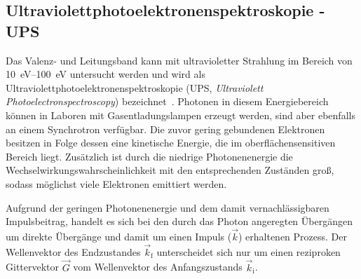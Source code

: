         \subsection{Ultraviolettphotoelektronenspektroskopie - UPS} \label{sec:UPS}
            Das Valenz- und Leitungsband kann mit ultravioletter Strahlung im Bereich von \SIrange{10}{100}{\electronvolt} untersucht werden und wird als Ultraviolettphotoelektronenspektroskopie (UPS, \textit{Ultraviolett Photoelectronspectroscopy}) bezeichnet~\cite{Fauster}.
            Photonen in diesem Energiebereich können in Laboren mit Gasentladungslampen erzeugt werden, sind aber ebenfalls an einem Synchrotron verfügbar.
            Die zuvor gering gebundenen Elektronen besitzen in Folge dessen eine kinetische Energie, die im oberflächensensitiven Bereich liegt.
            Zusätzlich ist durch die niedrige Photonenenergie die Wechselwirkungswahrscheinlichkeit mit den entsprechenden Zuständen groß, sodass möglichst viele Elektronen emittiert werden.

            Aufgrund der geringen Photonenenergie und dem damit vernachlässigbaren Impulsbeitrag, handelt es sich bei den durch das Photon angeregten Übergängen um direkte Übergänge und damit um einen Impuls ($\vec{k}$) erhaltenen Prozess.
            Der Wellenvektor des Endzustandes $\vec{k}_\text{f}$ unterscheidet sich nur um einen reziproken Gittervektor $\vec{G}$ vom Wellenvektor des Anfangszustands $\vec{k}_\text{i}$.

